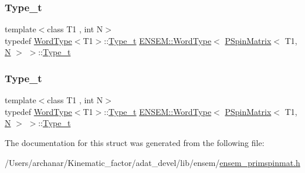 \subsubsection{\texorpdfstring{Type\_t}{Type\_t}\hspace{0.1cm}{\footnotesize\ttfamily [1/2]}}
{\footnotesize\ttfamily template$<$class T1 , int N$>$ \\
typedef \mbox{\hyperlink{structENSEM_1_1WordType}{Word\+Type}}$<$T1$>$\+::\mbox{\hyperlink{structENSEM_1_1WordType_3_01PSpinMatrix_3_01T1_00_01N_01_4_01_4_a497367a5083738a899e7e09e43127eec}{Type\+\_\+t}} \mbox{\hyperlink{structENSEM_1_1WordType}{E\+N\+S\+E\+M\+::\+Word\+Type}}$<$ \mbox{\hyperlink{classENSEM_1_1PSpinMatrix}{P\+Spin\+Matrix}}$<$ T1, \mbox{\hyperlink{operator__name__util_8cc_a7722c8ecbb62d99aee7ce68b1752f337}{N}} $>$ $>$\+::\mbox{\hyperlink{structENSEM_1_1WordType_3_01PSpinMatrix_3_01T1_00_01N_01_4_01_4_a497367a5083738a899e7e09e43127eec}{Type\+\_\+t}}}

\mbox{\label{structENSEM_1_1WordType_3_01PSpinMatrix_3_01T1_00_01N_01_4_01_4_a497367a5083738a899e7e09e43127eec}} 
\subsubsection{\texorpdfstring{Type\_t}{Type\_t}\hspace{0.1cm}{\footnotesize\ttfamily [2/2]}}
{\footnotesize\ttfamily template$<$class T1 , int N$>$ \\
typedef \mbox{\hyperlink{structENSEM_1_1WordType}{Word\+Type}}$<$T1$>$\+::\mbox{\hyperlink{structENSEM_1_1WordType_3_01PSpinMatrix_3_01T1_00_01N_01_4_01_4_a497367a5083738a899e7e09e43127eec}{Type\+\_\+t}} \mbox{\hyperlink{structENSEM_1_1WordType}{E\+N\+S\+E\+M\+::\+Word\+Type}}$<$ \mbox{\hyperlink{classENSEM_1_1PSpinMatrix}{P\+Spin\+Matrix}}$<$ T1, \mbox{\hyperlink{operator__name__util_8cc_a7722c8ecbb62d99aee7ce68b1752f337}{N}} $>$ $>$\+::\mbox{\hyperlink{structENSEM_1_1WordType_3_01PSpinMatrix_3_01T1_00_01N_01_4_01_4_a497367a5083738a899e7e09e43127eec}{Type\+\_\+t}}}



The documentation for this struct was generated from the following file\+:\begin{DoxyCompactItemize}
\item 
/\+Users/archanar/\+Kinematic\+\_\+factor/adat\+\_\+devel/lib/ensem/\mbox{\hyperlink{lib_2ensem_2ensem__primspinmat_8h}{ensem\+\_\+primspinmat.\+h}}\end{DoxyCompactItemize}
